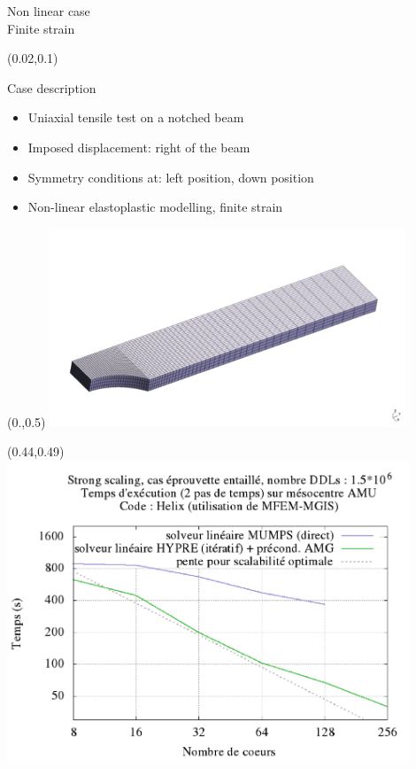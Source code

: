 \documentclass{beamer}
\begin{document}
\begin{frame}{Non linear case \\\hspace*{1cm} Finite strain}
\begin{textblock}{.9}(0.02,0.1)
  \begin{block}{Case description}
    \begin{itemize}
      \item Uniaxial tensile test on a notched beam
      \item Imposed displacement: right of the beam
      \item Symmetry conditions at: left position, down position 
      \item Non-linear elastoplastic modelling, finite strain
    \end{itemize}
  \end{block}
\end{textblock}
\begin{textblock}{.5}(0.,0.5)
\includegraphics[width=0.8\textwidth]{img/ssna303-geom.png}\\
\hspace*{3mm}{\small 3D geometry of the notched beam}
\end{textblock}
\begin{textblock}{.5}(0.44,0.49)
\includegraphics[width=0.9\textwidth]{img/ssna303_scaling.png}
\end{textblock}
\end{frame}
\end{document}
